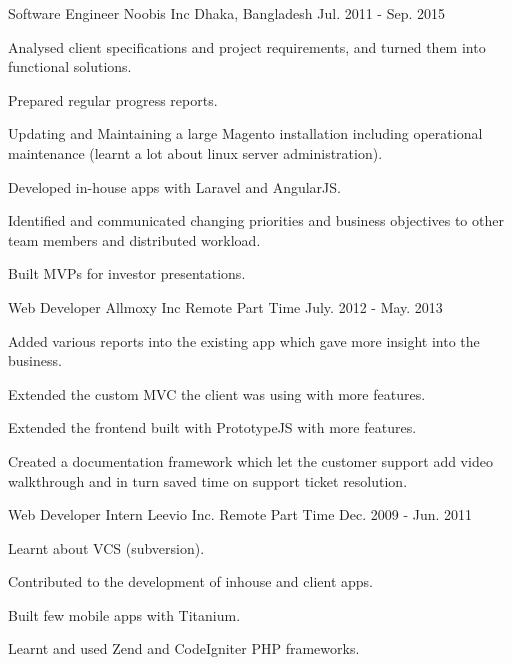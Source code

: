 \begin{cventries}
  \cventry
    {Software Engineer} %
    {Noobis Inc} %
    {Dhaka, Bangladesh} %
    {Jul. 2011 - Sep. 2015} %
    {
      \begin{cvitems} %
        \item {Analysed client specifications and project requirements, and turned them into functional solutions.}
        \item {Prepared regular progress reports.}
        \item {Updating and Maintaining a large Magento installation including operational maintenance (learnt a lot about linux server administration).}
        \item {Developed in-house apps with Laravel and AngularJS.}
        \item {Identified and communicated changing priorities and business objectives to other team members and distributed workload.}
        \item {Built MVPs for investor presentations.}
      \end{cvitems}
    }
  \cventry
    {Web Developer} %
    {Allmoxy Inc} %
    {Remote Part Time} %
    {July. 2012 - May. 2013} %
    {
      \begin{cvitems} %
        \item {Added various reports into the existing app which gave more insight into the business.}
        \item {Extended the custom MVC the client was using with more features.}
        \item {Extended the frontend built with PrototypeJS with more features.}
        \item {Created a documentation framework which let the customer support add video walkthrough and in turn saved time on support ticket resolution.}
      \end{cvitems}
    }

  \cventry
    {Web Developer Intern} %
    {Leevio Inc.} %
    {Remote Part Time} %
    {Dec. 2009 - Jun. 2011 } %
    {
      \begin{cvitems} %
      \item {Learnt about VCS (subversion).}
      \item {Contributed to the development of inhouse and client apps.}
      \item {Built few mobile apps with Titanium.}
      \item {Learnt and used Zend and CodeIgniter PHP frameworks.}
      \end{cvitems}
    }
\end{cventries}
